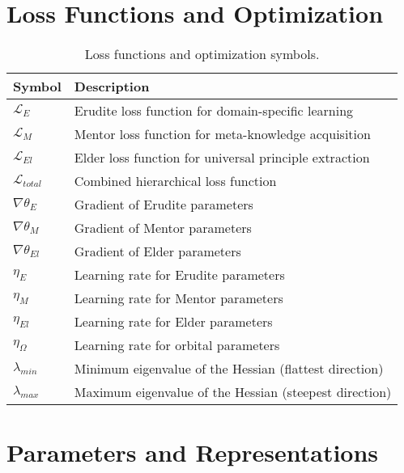 \section{Loss Functions and Optimization}

\begin{table}[h]
\centering
\begin{tabular}{|l|p{10cm}|}
\hline
\textbf{Symbol} & \textbf{Description} \\
\hline
$\mathcal{L}_E$ & Erudite loss function for domain-specific learning \\
\hline
$\mathcal{L}_M$ & Mentor loss function for meta-knowledge acquisition \\
\hline
$\mathcal{L}_{El}$ & Elder loss function for universal principle extraction \\
\hline
$\mathcal{L}_{total}$ & Combined hierarchical loss function \\
\hline
$\nabla \theta_E$ & Gradient of Erudite parameters \\
\hline
$\nabla \theta_M$ & Gradient of Mentor parameters \\
\hline
$\nabla \theta_{El}$ & Gradient of Elder parameters \\
\hline
$\eta_E$ & Learning rate for Erudite parameters \\
\hline
$\eta_M$ & Learning rate for Mentor parameters \\
\hline
$\eta_{El}$ & Learning rate for Elder parameters \\
\hline
$\eta_{\Omega}$ & Learning rate for orbital parameters \\
\hline
$\lambda_{min}$ & Minimum eigenvalue of the Hessian (flattest direction) \\
\hline
$\lambda_{max}$ & Maximum eigenvalue of the Hessian (steepest direction) \\
\hline
\end{tabular}
\caption{Loss functions and optimization symbols.}
\label{tab:symbols_loss}
\end{table}

\section{Parameters and Representations}

